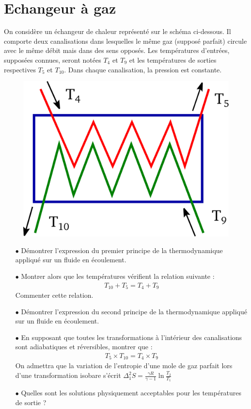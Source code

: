 \documentclass{report}
\begin{document}
\newpage

\section*{Echangeur à gaz}

On considère un échangeur de chaleur représenté sur le schéma ci-dessous. Il comporte deux canalisations dans lesquelles le même gaz (supposé parfait) circule avec le même débit mais dans des sens opposés. Les températures d'entrées, supposées connues, seront notées $T_{4}$ et $T_{9}$ et les températures de sorties respectives $T_{5}$ et $T_{10}$. Dans chaque canalisation, la pression est constante. 

\begin{figure}[!h]
\centering
\includegraphics[width=0.3\linewidth]{echangeur.pdf}
\end{figure}

\begin{itemize}

	\item[$\bullet$] Démontrer l'expression du premier principe de la thermodynamique appliqué sur un fluide en écoulement.
	
	\item[$\bullet$] Montrer alors que les températures vérifient la relation suivante :
	\begin{align*}
		T_{10}+ T_5 = T_4+T_9
	\end{align*}
	Commenter cette relation.
	
	\item[$\bullet$] Démontrer l'expression du second principe de la thermodynamique appliqué sur un fluide en écoulement.
	
	\item[$\bullet$] En supposant que toutes les transformations à l'intérieur des canalisations sont adiabatiques et réversibles, montrer que :
	\begin{align*}
		T_5\times T_{10}=T_4\times T_9
	\end{align*}
	On admettra que la variation de l'entropie d'une mole de gaz parfait lors d'une transformation isobare s'écrit $\Delta_1^2 S = \frac{\gamma R}{\gamma-1}\ln\frac{T_2}{T_1}$
	\item[$\bullet$] Quelles sont les solutions physiquement acceptables pour les températures de sortie ?

\end{itemize}
\end{document}
